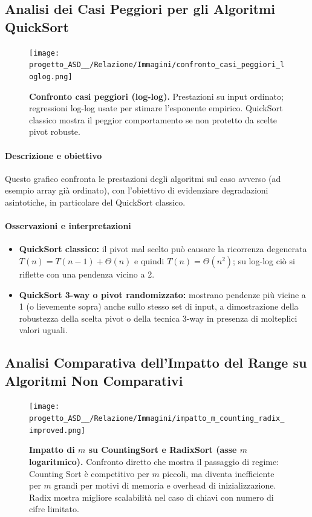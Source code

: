 \documentclass[a4paper, 11pt]{article}
\begin{document}
\subsection{Analisi dei Casi Peggiori per gli Algoritmi QuickSort}
\begin{figure}[H]
\centering
\texttt{[image: progetto\_ASD\_\_/Relazione/Immagini/confronto\_casi\_peggiori\_loglog.png]}
\caption{\textbf{Confronto casi peggiori (log-log).} Prestazioni su input ordinato; regressioni log-log usate per stimare l'esponente empirico. QuickSort classico mostra il peggior comportamento se non protetto da scelte pivot robuste.}
\label{fig:variazione_m}
\end{figure}

\paragraph{Descrizione e obiettivo}
Questo grafico confronta le prestazioni degli algoritmi sul caso avverso (ad esempio array già ordinato), con l'obiettivo di evidenziare degradazioni asintotiche, in particolare del QuickSort classico.

\paragraph{Osservazioni e interpretazioni}
\begin{itemize}
  \item \textbf{QuickSort classico:} il pivot mal scelto può causare la ricorrenza degenerata \(T(n)=T(n-1)+\Theta(n)\) e quindi \(T(n)=\Theta(n^2)\); su log-log ciò si riflette con una pendenza vicino a 2.
  \item \textbf{QuickSort 3-way o pivot randomizzato:} mostrano pendenze più vicine a 1 (o lievemente sopra) anche sullo stesso set di input, a dimostrazione della robustezza della scelta pivot o della tecnica 3-way in presenza di molteplici valori uguali.
\end{itemize}

\subsection{Analisi Comparativa dell'Impatto del Range su Algoritmi Non Comparativi}
\begin{figure}[H]
\centering
\texttt{[image: progetto\_ASD\_\_/Relazione/Immagini/impatto\_m\_counting\_radix\_improved.png]}
\caption{\textbf{Impatto di \(m\) su CountingSort e RadixSort (asse \(m\) logaritmico).} Confronto diretto che mostra il passaggio di regime: Counting Sort è competitivo per \(m\) piccoli, ma diventa inefficiente per \(m\) grandi per motivi di memoria e overhead di inizializzazione. Radix mostra migliore scalabilità nel caso di chiavi con numero di cifre limitato.}
\label{fig:variazione_m}
\end{figure}
\end{document}
